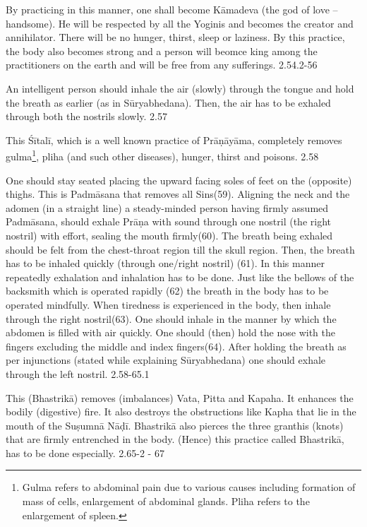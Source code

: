 
By practicing in this manner, one shall become Kāmadeva (the god of love – handsome). He will be respected by all the Yoginis and becomes the creator and annihilator. There will be no hunger, thirst, sleep or laziness. By this practice, the body also becomes strong and a person will beomce king among the practitioners on the earth and will be free from any sufferings.   2.54.2-56


An intelligent person should inhale the air (slowly) through the tongue and hold the breath as earlier (as in Sūryabhedana). Then, the air has to be exhaled through both the nostrils slowly.  2.57


This Śītalī, which is a well known practice of Prāṇāyāma, completely removes gulma\footnote{Gulma refers to abdominal pain due to various causes including formation of mass of cells, enlargement of abdominal glands. Pliha refers to the enlargement of spleen.}, pliha (and such other diseases), hunger, thirst and poisons.  2.58


One should stay seated placing the upward facing soles of feet on the (opposite) thighs. This is Padmāsana that removes all Sins(59). Aligning the neck and the adomen (in a straight line) a steady-minded person having firmly assumed Padmāsana, should exhale Prāṇa with sound through one nostril (the right nostril) with effort, sealing the mouth firmly(60). The breath being exhaled should be felt from the chest-throat region till the skull region. Then, the breath has to be inhaled quickly (through one/right nostril) (61). In this manner repeatedly exhalation and inhalation has to be done. Just like the bellows of the backsmith which is operated rapidly (62) the breath in the body has to be operated mindfully. When tiredness is experienced in the body, then inhale through the right nostril(63). One should inhale in the manner by which the abdomen is filled with air quickly. One should (then) hold the nose with the fingers excluding the middle and index fingers(64). After holding the breath as per injunctions (stated while explaining Sūryabhedana) one should exhale through the left nostril. 2.58-65.1


This (Bhastrikā) removes (imbalances) Vata, Pitta and Kapaha. It enhances the bodily (digestive) fire. It also destroys the obstructions like Kapha that lie in the mouth of the Suṣumnā Nāḍī. Bhastrikā also pierces the three granthis (knots) that are firmly entrenched in the body. (Hence) this practice called Bhastrikā, has to be done especially. 2.65-2 - 67

